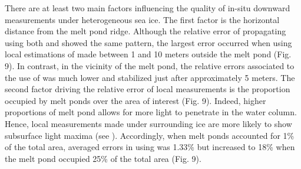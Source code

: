 There are at least two main factors influencing the quality of in-situ downward measurements under heterogeneous sea ice. The first factor is the horizontal distance from the melt pond ridge. Although the relative error of propagating \edzero{} using both \ked{} and \klu{} showed the same pattern, the largest error occurred when using local estimations of \ked{} made between 1 and 10 meters outside the melt pond (Fig. 9). In contrast, in the vicinity of the melt pond, the relative errors associated to the use of \klu{} was much lower and stabilized just after approximately 5 meters. The second factor driving the relative error of local measurements is the proportion occupied by melt ponds over the area of interest (Fig. 9). Indeed, higher proportions of melt pond allows for more light to penetrate in the water column. Hence, local measurements made under surrounding ice are more likely to show subsurface light maxima (see \citet{Frey2011}). Accordingly, when melt ponds accounted for 1\% of the total area, averaged errors in \edz{} using \klu{} was 1.33\% but increased to 18\% when the melt pond occupied 25\% of the total area (Fig. 9).